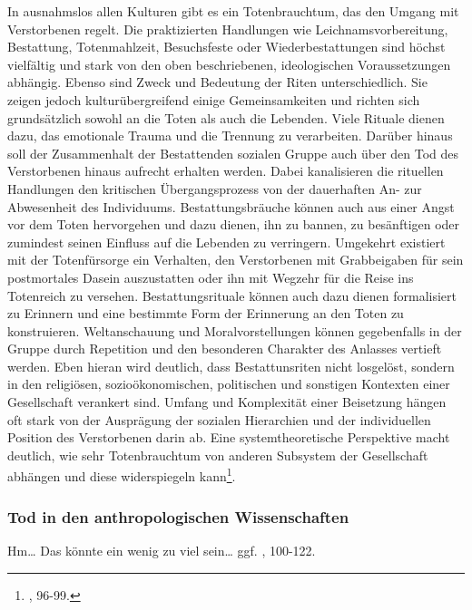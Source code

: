 \documentclass[openany,twoside,twocolumn]{book}
\let\rmarkdownfootnote\footnote%
\def\footnote{\protect\rmarkdownfootnote}
\begin{document}
In ausnahmslos allen Kulturen gibt es ein Totenbrauchtum, das den Umgang
mit Verstorbenen regelt. Die praktizierten Handlungen wie
Leichnamsvorbereitung, Bestattung, Totenmahlzeit, Besuchsfeste oder
Wiederbestattungen sind höchst vielfältig und stark von den oben
beschriebenen, ideologischen Voraussetzungen abhängig. Ebenso sind Zweck
und Bedeutung der Riten unterschiedlich. Sie zeigen jedoch
kulturübergreifend einige Gemeinsamkeiten und richten sich grundsätzlich
sowohl an die Toten als auch die Lebenden. Viele Rituale dienen dazu,
das emotionale Trauma und die Trennung zu verarbeiten. Darüber hinaus
soll der Zusammenhalt der Bestattenden sozialen Gruppe auch über den Tod
des Verstorbenen hinaus aufrecht erhalten werden. Dabei kanalisieren die
rituellen Handlungen den kritischen Übergangsprozess von der dauerhaften
An- zur Abwesenheit des Individuums. Bestattungsbräuche können auch aus
einer Angst vor dem Toten hervorgehen und dazu dienen, ihn zu bannen, zu
besänftigen oder zumindest seinen Einfluss auf die Lebenden zu
verringern. Umgekehrt existiert mit der Totenfürsorge ein Verhalten, den
Verstorbenen mit Grabbeigaben für sein postmortales Dasein auszustatten
oder ihn mit Wegzehr für die Reise ins Totenreich zu versehen.
Bestattungsrituale können auch dazu dienen formalisiert zu Erinnern und
eine bestimmte Form der Erinnerung an den Toten zu konstruieren.
Weltanschauung und Moralvorstellungen können gegebenfalls in der Gruppe
durch Repetition und den besonderen Charakter des Anlasses vertieft
werden. Eben hieran wird deutlich, dass Bestattunsriten nicht losgelöst,
sondern in den religiösen, sozioökonomischen, politischen und sonstigen
Kontexten einer Gesellschaft verankert sind. Umfang und Komplexität
einer Beisetzung hängen oft stark von der Ausprägung der sozialen
Hierarchien und der individuellen Position des Verstorbenen darin ab.
Eine systemtheoretische Perspektive macht deutlich, wie sehr
Totenbrauchtum von anderen Subsystem der Gesellschaft abhängen und diese
widerspiegeln kann\footnote{\textcite{hofmann_rituelle_2008}, 96-99.}.

\hypertarget{tod-in-den-anthropologischen-wissenschaften}{%
\subsubsection{Tod in den anthropologischen
Wissenschaften}\label{tod-in-den-anthropologischen-wissenschaften}}

Hm\ldots{} Das könnte ein wenig zu viel sein\ldots{} ggf.
\textcite{hofmann_rituelle_2008}, 100-122.
\end{document}
